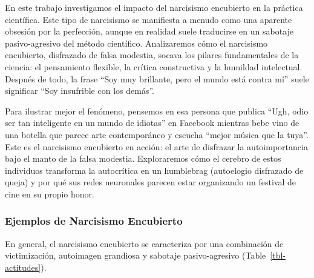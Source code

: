 \documentclass[
]{article}
\begin{document}
En este trabajo investigamos el impacto del narcisismo encubierto en la
práctica científica. Este tipo de narcisismo se manifiesta a menudo como
una aparente obsesión por la perfección, aunque en realidad suele
traducirse en un sabotaje pasivo-agresivo del método científico.
Analizaremos cómo el narcisismo encubierto, disfrazado de falsa
modestia, socava los pilares fundamentales de la ciencia: el pensamiento
flexible, la crítica constructiva y la humildad intelectual. Después de
todo, la frase ``Soy muy brillante, pero el mundo está contra mí'' suele
significar ``Soy insufrible con los demás''.

Para ilustrar mejor el fenómeno, pensemos en esa persona que publica
``Ugh, odio ser tan inteligente en un mundo de idiotas'' en Facebook
mientras bebe vino de una botella que parece arte contemporáneo y
escucha ``mejor música que la tuya''. Este es el narcisismo encubierto
en acción: el arte de disfrazar la autoimportancia bajo el manto de la
falsa modestia. Exploraremos cómo el cerebro de estos individuos
transforma la autocrítica en un humblebrag (autoelogio disfrazado de
queja) y por qué sus redes neuronales parecen estar organizando un
festival de cine en su propio honor.

\subsubsection{Ejemplos de Narcisismo
Encubierto}\label{ejemplos-de-narcisismo-encubierto}

En general, el narcisismo encubierto se caracteriza por una combinación
de victimización, autoimagen grandiosa y sabotaje pasivo-agresivo
(Table~\ref{tbl-actitudes}).
\end{document}
